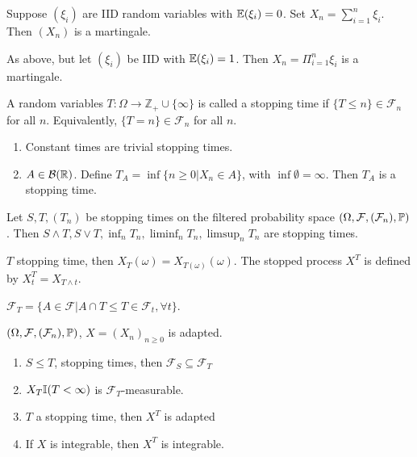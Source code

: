 \begin{exmp}
  \label{defn:discrete_time_martingales:2}
  Suppose $(\xi_{i})$ are IID random variables with $\E{\xi_{i}} = 0$.
  Set $X_{n} = \sum_{i=1}^{n} \xi_{i}$.  Then $(X_{n})$ is a martingale.
\end{exmp}

\begin{exmp}
  \label{defn:discrete_time_martingales:3}
  As above, but let $(\xi_{i})$ be IID with $\E{\xi_{i}} = 1$. Then
  $X_{n} = \Pi_{i=1}^{n} \xi_{i}$ is a martingale.
\end{exmp}

\begin{defn}
  \label{defn:discrete_time_martingales:4}
  A random variables $T: \Omega \rightarrow \mathbb{Z}_{+} \cup \{ \infty \}$
  is called a stopping time if $\{ T \leq n \} \in \mathcal{F}_{n}$
  for all $n$.  Equivalently, $\{ T = n \} \in \mathcal{F}_{n}$ for
  all $n$.
\end{defn}

\begin{exmp}
  \label{defn:discrete_time_martingales:5}
  \begin{enumerate}
  \item Constant times are trivial stopping times.
  \item $A \in \mathcal{B}(\mathbb{R})$.  Define $T_{A} = \inf \{ n \geq 0 |
    X_{n} \in A \}$, with $\inf \emptyset = \infty$.  Then $T_{A}$ is a
    stopping time.
  \end{enumerate}
\end{exmp}

\begin{proposition}
  Let $S, T, (T_{n})$ be stopping times on the filtered probability
  space $(\Omega, \mathcal{F}, (\mathcal{F}_{n}), \Prob)$.  Then $S \wedge
  T, S \vee T, \inf_{n} T_{n}, \liminf_{n} T_{n}, \limsup_{n} T_{n}$
  are stopping times. 
\end{proposition}

\begin{notation}
  $T$ stopping time, then $X_{T}(\omega) = X_{T(\omega)}(\omega)$. The
  stopped process $X^{T}$ is defined by $X^{T}_{t} = X_{T \wedge t}$.

  $\mathcal{F}_{T} = \{ A \in \mathcal{F} | A \cap {T \leq T} \in
  \mathcal{F}_{t}, \forall t \}$.
\end{notation}

\begin{proposition}
  $(\Omega, \mathcal{F}, (\mathcal{F}_{n}), \Prob)$, $X = (X_{n})_{n
    \geq 0}$ is adapted.
  \begin{enumerate}
  \item $S \leq T$, stopping times, then $\mathcal{F}_{S} \subseteq \mathcal{F}_{T}$
  \item $X_{T} \I{T < \infty}$ is $\mathcal{F}_{T}$-measurable.
  \item $T$ a stopping time, then $X^{T}$ is adapted
  \item If $X$ is integrable, then $X^{T}$ is integrable.
  \end{enumerate}
\end{proposition}

